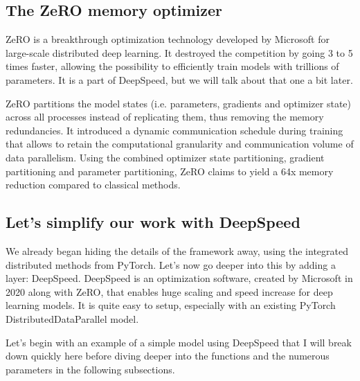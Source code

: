 \documentclass{article}
\begin{document}
\subsection{The ZeRO memory optimizer}
ZeRO is a breakthrough optimization technology developed by Microsoft for large-scale distributed deep learning. It destroyed the competition by going 3 to 5 times faster, allowing the possibility to efficiently train models with trillions of parameters. It is a part of DeepSpeed, but we will talk about that one a bit later.

ZeRO partitions the model states (i.e. parameters, gradients and optimizer state) across all processes instead of replicating them, thus removing the memory redundancies. It introduced a dynamic communication schedule during training that allows to retain the computational granularity and communication volume of data parallelism. Using the combined optimizer state partitioning, gradient partitioning and parameter partitioning, ZeRO claims to yield a 64x memory reduction compared to classical methods.

\subsection{Let's simplify our work with DeepSpeed}
We already began hiding the details of the framework away, using the integrated distributed methods from PyTorch. Let's now go deeper into this by adding a layer: DeepSpeed. DeepSpeed is an optimization software, created by Microsoft in 2020 along with ZeRO, that enables huge scaling and speed increase for deep learning models. It is quite easy to setup, especially with an existing PyTorch DistributedDataParallel model.

Let's begin with an example of a simple model using DeepSpeed that I will break down quickly here before diving deeper into the functions and the numerous parameters in the following subsections.
\end{document}
